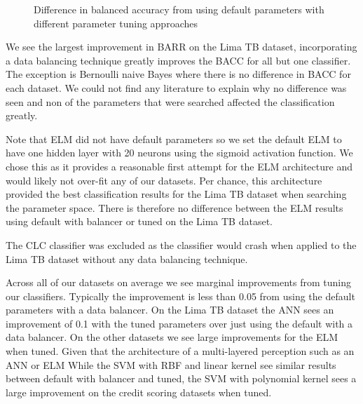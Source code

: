 \documentclass{sig-alternate-05-2015}
\begin{document}
	\begin{figure}
		\centering
		\caption{Difference in balanced accuracy from using default parameters with different parameter tuning approaches}
		\label{fig:parameter_tuning}
	\end{figure}
	
	We see the largest improvement in BARR on the Lima TB dataset, incorporating a data balancing technique greatly improves the BACC for all but one classifier. The exception is Bernoulli naive Bayes where there is no difference in BACC for each dataset. We could not find any literature to explain why no difference was seen and non of the parameters that were searched affected the classification greatly.
	
	Note that ELM did not have default parameters so we set the default ELM to have one hidden layer with 20 neurons using the sigmoid activation function. We chose this as it provides a reasonable first attempt for the ELM architecture and would likely not over-fit any of our datasets. Per chance, this architecture provided the best classification results for the Lima TB dataset when searching the parameter space. There is therefore no difference between the ELM results using default with balancer or tuned on the Lima TB dataset.
	
	The CLC classifier was excluded as the classifier would crash when applied to the Lima TB dataset without any data balancing technique.
	
	Across all of our datasets on average we see marginal improvements from tuning our classifiers. Typically the improvement is less than 0.05 from using the default parameters with a data balancer. On the Lima TB dataset the ANN sees an improvement of 0.1 with the tuned parameters over just using the default with a data balancer. On the other datasets we see large improvements for the ELM when tuned. Given that the architecture of a multi-layered perception such as an ANN or ELM  While the SVM with RBF and linear kernel see similar results between default with balancer and tuned, the SVM with polynomial kernel sees a large improvement on the credit scoring datasets when tuned.
	
\end{document}
